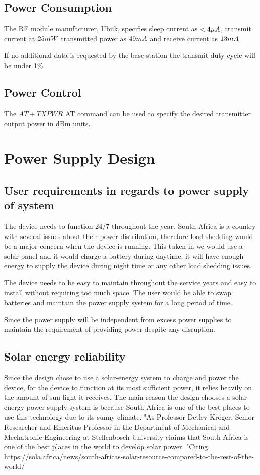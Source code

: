 \documentclass[12pt]{article}
\begin{document}
\subsection{Power Consumption}
The RF module manufacturer, Ubiik, specifies sleep current as $<4 \space \mu A$, transmit current at $25 \space mW$ 
transmitted power as $49 \space mA$ and receive current as $13 \space mA$. %

If no additional data is requested by the base station the transmit duty cycle will be under 1\%.

\subsection{Power Control}
The $AT+TXPWR$ AT command can be used to specify the desired transmitter output power in dBm units.

\section{Power Supply Design}
\subsection{User requirements in regards to power supply of system}
The device needs to function 24/7 throughout the year. South Africa is a country with several issues about their power distribution, therefore load shedding would be a major concern when the device is running. This taken in we would use a solar panel and it would charge a battery during daytime. it will have enough energy to supply the device during night time or any other load shedding issues.

The device needs to be easy to maintain throughout the service years and easy to install without requiring too much space. The user would be able to swap batteries and maintain the power supply system for a long period of time.

Since the power supply will be independent from  excess power supplies to maintain the requirement of providing power despite any disruption.

\subsection{Solar energy reliability}
Since the design chose to use a solar-energy system to charge and power the device, for the device to function at its most sufficient power, it relies heavily on the amount of sun light it receives. The main reason the design chooses a solar energy power supply system is because South Africa is one of the best places to use this technology due to its sunny climate. "As Professor Detlev Kröger, Senior Researcher and Emeritus Professor in the Department of Mechanical and Mechatronic Engineering at Stellenbosch University claims that South Africa is one of the best places in the world to develop solar power. "Citing
https://sola.africa/news/south-africas-solar-resource-compared-to-the-rest-of-the-world/
\end{document}
